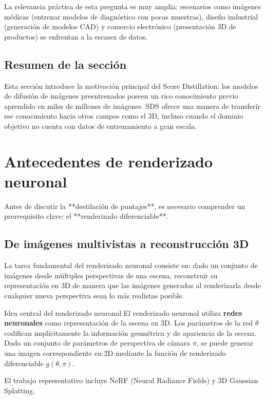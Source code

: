 \documentclass[a4paper]{article}
\begin{document}
La relevancia práctica de esta pregunta es muy amplia: escenarios como imágenes médicas (entrenar modelos de diagnóstico con pocas muestras), diseño industrial (generación de modelos CAD) y comercio electrónico (presentación 3D de productos) se enfrentan a la escasez de datos.

\subsection{Resumen de la sección}

Esta sección introduce la motivación principal del Score Distillation: los modelos de difusión de imágenes preentrenados poseen un rico conocimiento previo aprendido en miles de millones de imágenes. SDS ofrece una manera de transferir ese conocimiento hacia otros campos como el 3D, incluso cuando el dominio objetivo no cuenta con datos de entrenamiento a gran escala.

\newpage
\section{Antecedentes de renderizado neuronal}

Antes de discutir la **destilación de puntajes**, es necesario comprender un prerrequisito clave: el **renderizado diferenciable**.

\subsection{De imágenes multivistas a reconstrucción 3D}

La tarea fundamental del renderizado neuronal consiste en: dado un conjunto de imágenes desde múltiples perspectivas de una escena, reconstruir su representación en 3D de manera que las imágenes generadas al renderizarla desde cualquier nueva perspectiva sean lo más realistas posible.

\begin{knowledgebox}{Idea central del renderizado neuronal}
El renderizado neuronal utiliza \textbf{redes neuronales} como representación de la escena en 3D. Los parámetros de la red $\theta$ codifican implícitamente la información geométrica y de apariencia de la escena. Dado un conjunto de parámetros de perspectiva de cámara $\pi$, se puede generar una imagen correspondiente en 2D mediante la función de renderizado diferenciable $g(\theta, \pi)$.

El trabajo representativo incluye NeRF (Neural Radiance Fields) y 3D Gaussian Splatting.
\end{knowledgebox}
\end{document}
